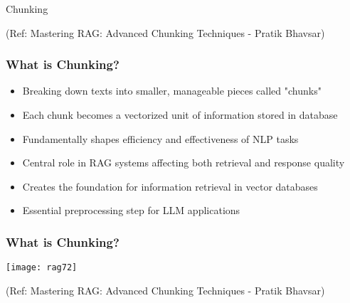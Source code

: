 





\begin{frame}[fragile]\frametitle{}
\begin{center}
{\Large Chunking}

{\tiny (Ref: Mastering RAG: Advanced Chunking Techniques - Pratik Bhavsar)}

\end{center}
\end{frame}

\begin{frame}[fragile]\frametitle{What is Chunking?}
      \begin{itemize}
\item Breaking down texts into smaller, manageable pieces called "chunks"
\item Each chunk becomes a vectorized unit of information stored in database
\item Fundamentally shapes efficiency and effectiveness of NLP tasks
\item Central role in RAG systems affecting both retrieval and response quality
\item Creates the foundation for information retrieval in vector databases
\item Essential preprocessing step for LLM applications
  \end{itemize}

\end{frame}

\begin{frame}[fragile]\frametitle{What is Chunking?}

  
  	\begin{center}
	\texttt{[image: rag72]}
	
	{\tiny (Ref: Mastering RAG: Advanced Chunking Techniques - Pratik Bhavsar)}
	
	\end{center}
\end{frame}

